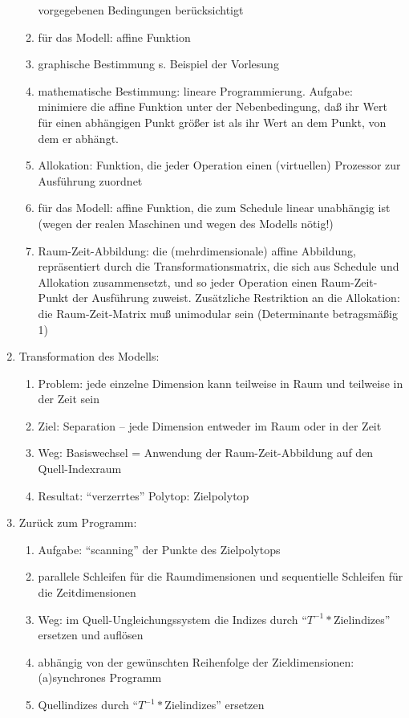 \begin{enumerate}
\begin{enumerate}
  vorgegebenen Bedingungen berücksichtigt
\item für das Modell: affine Funktion
\item graphische Bestimmung s. Beispiel der Vorlesung
\item mathematische Bestimmung: lineare Programmierung. Aufgabe:
  minimiere die affine Funktion unter der Nebenbedingung, daß ihr Wert
  für einen abhängigen Punkt größer ist als ihr Wert an dem Punkt, von
  dem er abhängt.
\item Allokation: Funktion, die jeder Operation einen (virtuellen)
  Prozessor zur Ausführung zuordnet
\item für das Modell: affine Funktion, die zum Schedule linear
  unabhängig ist (wegen der realen Maschinen und wegen des Modells
  nötig!)
\item Raum-Zeit-Abbildung: die (mehrdimensionale) affine Abbildung,
  repräsentiert durch die Transformationsmatrix, die sich aus Schedule
  und Allokation zusammensetzt, und so jeder Operation einen
  Raum-Zeit-Punkt der Ausführung zuweist. Zusätzliche Restriktion an die
  Allokation: die Raum-Zeit-Matrix muß unimodular sein (Determinante
  betragsmäßig 1)
\end{enumerate}
%
\item Transformation des Modells:
\begin{enumerate}
\item Problem: jede einzelne Dimension kann teilweise in Raum und
  teilweise in der Zeit sein
\item Ziel: Separation -- jede Dimension entweder im Raum oder in der Zeit
\item Weg: Basiswechsel = Anwendung der Raum-Zeit-Abbildung auf den
  Quell-Indexraum
\item Resultat: ``verzerrtes'' Polytop: Zielpolytop
\end{enumerate}
%
\item Zurück zum Programm:
\begin{enumerate}
\item Aufgabe: ``scanning'' der Punkte des Zielpolytops
\item parallele Schleifen für die Raumdimensionen und sequentielle
  Schleifen für die Zeitdimensionen
\item Weg: im Quell-Ungleichungssystem die Indizes durch
  ``$T^{-1}*$Zielindizes'' ersetzen und auflösen
\item abhängig von der gewünschten Reihenfolge der Zieldimensionen:
  (a)synchrones Programm
\item Quellindizes durch ``$T^{-1}*$Zielindizes'' ersetzen
\end{enumerate}
\end{enumerate}

